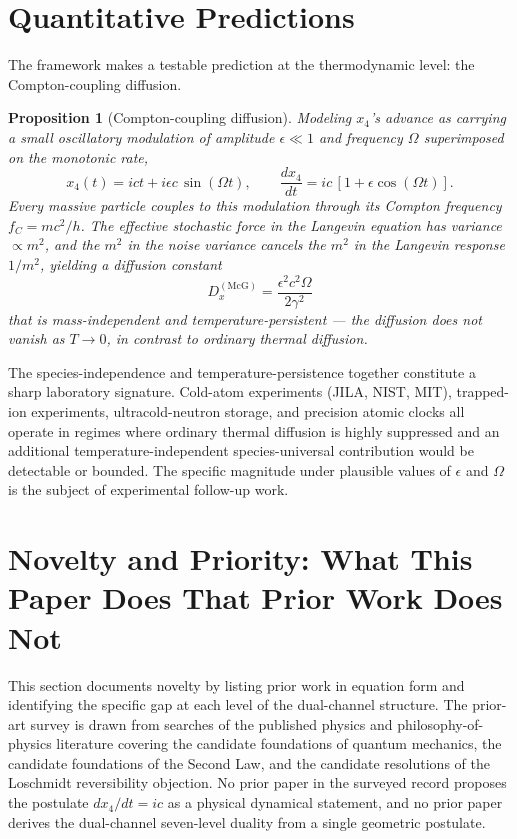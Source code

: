 \documentclass[11pt,a4paper]{article}
\newtheorem{proposition}{Proposition}
\begin{document}
\section{Quantitative Predictions}
\label{sec:predictions}

The framework makes a testable prediction at the thermodynamic level: the Compton-coupling diffusion.

\begin{proposition}[Compton-coupling diffusion]
\label{prop:compton diffusion}
Modeling $x_4$'s advance as carrying a small oscillatory modulation of amplitude $\epsilon \ll 1$ and frequency $\Omega$ superimposed on the monotonic rate,
\begin{equation}
x_4(t) = ict + i\epsilon c\, \sin(\Omega t), \qquad \frac{dx_4}{dt} = ic\,[1 + \epsilon \cos(\Omega t)].
\end{equation}
Every massive particle couples to this modulation through its Compton frequency $f_C = mc^2/h$. The effective stochastic force in the Langevin equation has variance $\propto m^2$, and the $m^2$ in the noise variance cancels the $m^2$ in the Langevin response $1/m^2$, yielding a diffusion constant
\begin{equation}
\boxed{D_x^{(\text{McG})} = \frac{\epsilon^2 c^2 \Omega}{2\gamma^2}}
\end{equation}
that is \emph{mass-independent} and \emph{temperature-persistent} --- the diffusion does not vanish as $T \to 0$, in contrast to ordinary thermal diffusion.
\end{proposition}

The species-independence and temperature-persistence together constitute a sharp laboratory signature. Cold-atom experiments (JILA, NIST, MIT), trapped-ion experiments, ultracold-neutron storage, and precision atomic clocks all operate in regimes where ordinary thermal diffusion is highly suppressed and an additional temperature-independent species-universal contribution would be detectable or bounded. The specific magnitude under plausible values of $\epsilon$ and $\Omega$ is the subject of experimental follow-up work.

\section{Novelty and Priority: What This Paper Does That Prior Work Does Not}
\label{sec:novelty}

This section documents novelty by listing prior work in equation form and identifying the specific gap at each level of the dual-channel structure. The prior-art survey is drawn from searches of the published physics and philosophy-of-physics literature covering the candidate foundations of quantum mechanics, the candidate foundations of the Second Law, and the candidate resolutions of the Loschmidt reversibility objection. No prior paper in the surveyed record proposes the postulate $dx_4/dt = ic$ as a physical dynamical statement, and no prior paper derives the dual-channel seven-level duality from a single geometric postulate.
\end{document}

